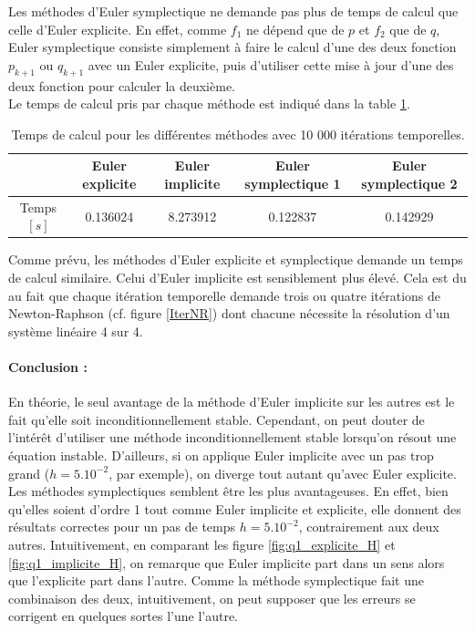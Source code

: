 Les méthodes d'Euler symplectique ne demande pas plus de temps de calcul que celle d'Euler explicite. En effet, comme $f_1$ ne dépend que de $p$ et $f_2$ que de $q$, Euler symplectique consiste simplement à faire le calcul d'une des deux fonction $p_{k+1}$ ou $q_{k+1}$ avec un Euler explicite, puis d'utiliser cette mise à jour d'une des deux fonction pour calculer la deuxième. \\
Le temps de calcul pris par chaque méthode est indiqué dans la table \ref{table_time}.

\begin{table}[h]
\centering
\begin{tabular}{|c|cccc|}
\hline
 & Euler explicite & Euler implicite & Euler symplectique 1 & Euler symplectique 2 \\
\hline
Temps $[s]$ & 0.136024 & 8.273912 & 0.122837 &  0.142929\\
\hline
\end{tabular}
\caption{Temps de calcul pour les différentes méthodes avec 10 000 itérations temporelles.}
\label{table_time}
\end{table}

Comme prévu, les méthodes d'Euler explicite et symplectique demande un temps de calcul similaire. Celui d'Euler implicite est sensiblement plus élevé. Cela est du au fait que chaque itération temporelle demande trois ou quatre itérations de Newton-Raphson (cf. figure \ref{IterNR}) dont chacune nécessite la résolution d'un système linéaire 4 sur 4.


\paragraph{Conclusion : } En théorie, le seul avantage de la méthode d'Euler implicite sur les autres est le fait qu'elle soit inconditionnellement stable. Cependant, on peut douter de l'intérêt d'utiliser une méthode inconditionnellement stable lorsqu'on résout une équation instable. D'ailleurs, si on applique Euler implicite avec un pas trop grand ($h=5.10^{-2}$, par exemple), on diverge tout autant qu'avec Euler explicite. \\
  Les méthodes symplectiques semblent être les plus avantageuses. En effet, bien qu'elles soient d'ordre 1 tout comme Euler implicite et explicite, elle donnent des résultats correctes pour un pas de temps $h=5.10^{-2}$, contrairement aux deux autres. Intuitivement, en comparant les figure \ref{fig:q1_explicite_H} et \ref{fig:q1_implicite_H}, on remarque que Euler implicite part dans un sens alors que l'explicite part dans l'autre. Comme la méthode symplectique fait une combinaison des deux, intuitivement, on peut supposer que les erreurs se corrigent en quelques sortes l'une l'autre.
  
